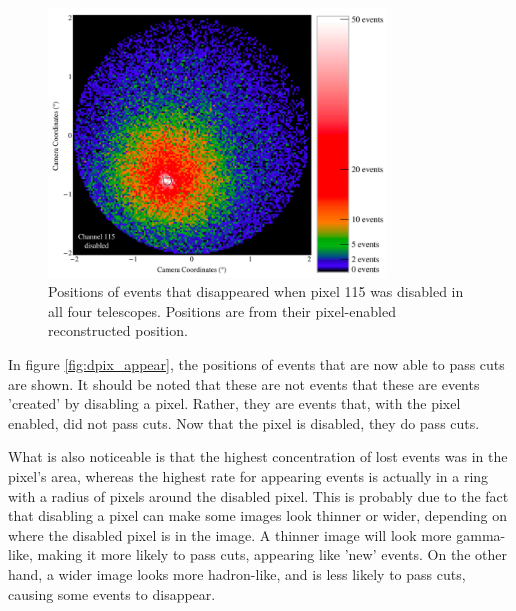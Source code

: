     \begin{figure}[ht]
      \begin{center}
        \includegraphics[width=0.8\textwidth]{images/disabled_pixel/disappearing_events}
        \caption[Disappering Events]{Positions of events that disappeared when pixel 115 was disabled in all four telescopes.  Positions are from their pixel-enabled reconstructed position.}\label{fig:dpix_disappear}
      \end{center}
    \end{figure}

    In figure \ref{fig:dpix_appear}, the positions of events that are now able to pass cuts are shown.
    It should be noted that these are not events that these are events 'created' by disabling a pixel.
    Rather, they are events that, with the pixel enabled, did not pass cuts.
    Now that the pixel is disabled, they do pass cuts.

    What is also noticeable is that the highest concentration of lost events was in the pixel's area, whereas the highest rate for appearing events is actually in a ring with a radius of  pixels around the disabled pixel.
    This is probably due to the fact that disabling a pixel can make some images look thinner or wider, depending on where the disabled pixel is in the image.
    A thinner image will look more gamma-like, making it more likely to pass cuts, appearing like 'new' events.
    On the other hand, a wider image looks more hadron-like, and is less likely to pass cuts, causing some events to disappear.

